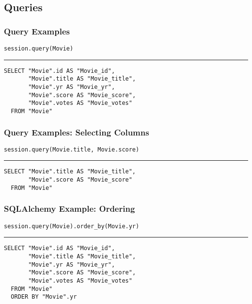 \documentclass[dvipsnames]{beamer}
\theoremstyle{plain}
\begin{document}
\subsection{Queries}

\begin{frame}[fragile]
  \frametitle{Query Examples}

  \begin{lstlisting}
session.query(Movie)
  \end{lstlisting}
  \hrule

  \begin{lstlisting}[language=FullSQL]
SELECT "Movie".id AS "Movie_id",
       "Movie".title AS "Movie_title",
       "Movie".yr AS "Movie_yr",
       "Movie".score AS "Movie_score",
       "Movie".votes AS "Movie_votes"
  FROM "Movie"
  \end{lstlisting}
\end{frame}

\begin{frame}[fragile]
  \frametitle{Query Examples: Selecting Columns}

  \begin{lstlisting}
session.query(Movie.title, Movie.score)
  \end{lstlisting}
  \hrule

  \begin{lstlisting}[language=FullSQL]
SELECT "Movie".title AS "Movie_title",
       "Movie".score AS "Movie_score"
  FROM "Movie"
  \end{lstlisting}
\end{frame}

\begin{frame}[fragile]
  \frametitle{SQLAlchemy Example: Ordering}

  \begin{lstlisting}
session.query(Movie).order_by(Movie.yr)
  \end{lstlisting}
  \hrule

  \begin{lstlisting}[language=FullSQL]
SELECT "Movie".id AS "Movie_id",
       "Movie".title AS "Movie_title",
       "Movie".yr AS "Movie_yr",
       "Movie".score AS "Movie_score",
       "Movie".votes AS "Movie_votes"
  FROM "Movie"
  ORDER BY "Movie".yr
  \end{lstlisting}
\end{frame}
\end{document}
